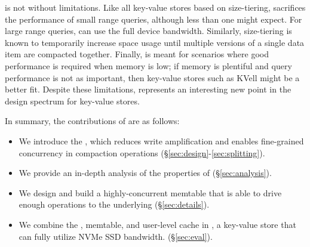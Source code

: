 %

\sysname is not without limitations. Like all key-value stores based
on size-tiering, \sysname sacrifices the performance of small range
queries, although less than one might expect.  For large range
queries, \sysname can use the full device bandwidth. Similarly,
size-tiering is known to temporarily increase space usage until
multiple versions of a single data item are compacted
together. Finally, \sysname is meant for scenarios where good
performance is required when memory is low; if memory is plentiful
and query performance is not as important,
then key-value stores such as KVell might be a better fit. Despite
these limitations, \sysname represents an interesting new point in the
design spectrum for key-value stores.

In summary, the contributions of \sysname are as follows:
\begin{itemize}
\item We introduce the \datastruct, which reduces write amplification and
enables fine-grained concurrency in compaction operations (\S\ref{sec:design}-\ref{sec:splitting}).

\ifsupplemental
  \item We provide an in-depth analysis of the properties of \datastruct (\S\ref{sec:analysis}).
    \fi
  
\item We design and build a highly-concurrent memtable that is able to
drive enough operations to the underlying \datastruct (\S\ref{sec:details}).

\item We combine the \datastruct, memtable, and user-level cache in \sysname, 
a key-value store that can fully utilize NVMe SSD bandwidth. (\S\ref{sec:eval}).
\end{itemize}
